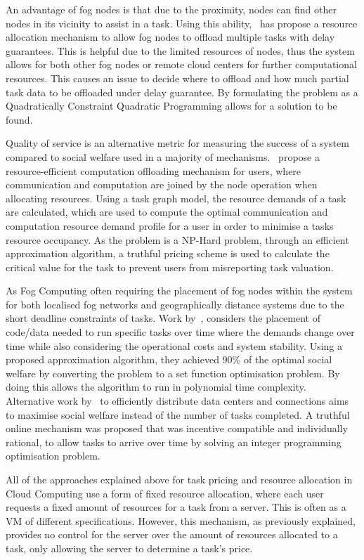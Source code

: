 An advantage of fog nodes is that due to the proximity, nodes can find other nodes in its vicinity to assist in a task.
Using this ability,~\cite{8839780} has propose a resource allocation mechanism to allow fog nodes to offload multiple
tasks with delay guarantees. This is helpful due to the limited resources of nodes, thus the system allows for
both other fog nodes or remote cloud centers for further computational resources. This causes an issue to decide where
to offload and how much partial task data to be offloaded under delay guarantee. By formulating the problem as a
Quadratically Constraint Quadratic Programming allows for a solution to be found.

Quality of service is an alternative metric for measuring the success of a system compared to social welfare used in a
majority of mechanisms.~\cite{8379445} propose a resource-efficient computation offloading mechanism for users, where
communication and computation are joined by the node operation when allocating resources. Using a task graph model, the
resource demands of a task are calculated, which are used to compute the optimal communication and computation resource
demand profile for a user in order to minimise a tasks resource occupancy. As the problem is a NP-Hard problem, through an
efficient approximation algorithm, a truthful pricing scheme is used to calculate the critical value for the task to
prevent users from misreporting task valuation.

As Fog Computing often requiring the placement of fog nodes within the system for both localised fog networks and
geographically distance systems due to the short deadline constraints of tasks. Work by~\cite{vaji_infocom}, considers
the placement of code/data needed to run specific tasks over time where the demands change over time while also
considering the operational costs and system stability. Using a proposed approximation algorithm, they achieved 90\% of
the optimal social welfare by converting the problem to a set function optimisation problem. By doing this allows the
algorithm to run in polynomial time complexity. \\
Alternative work by~\cite{Bi2019} to efficiently distribute data centers and connections aims to maximise social
welfare instead of the number of tasks completed. A truthful online mechanism was proposed that was incentive compatible
and individually rational, to allow tasks to arrive over time by solving an integer programming optimisation problem.

All of the approaches explained above for task pricing and resource allocation in Cloud Computing use a form of fixed
resource allocation, where each user requests a fixed amount of resources for a task from a server. This is often as a
VM of different specifications. However, this mechanism, as previously explained, provides no control for the server
over the amount of resources allocated to a task, only allowing the server to determine a task's price.

